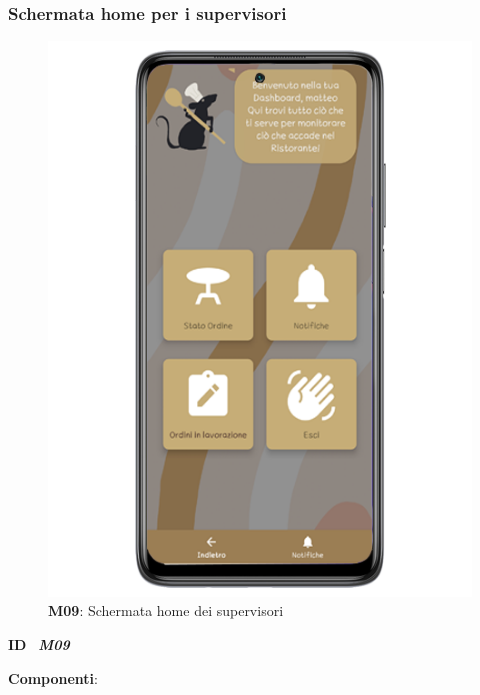         \newpage

        \subsubsection{Schermata home per i supervisori}
          \begin{figure}[H]
              \centering
              \includegraphics[scale=2.5]{assets/Mockup/Mockup_HypervisorDash.png}
              \caption*{\textbf{M09}: Schermata home dei supervisori}\label{fig:Mockup_HypervisorDash}
          \end{figure}

          \begin{flushleft}
              \textbf{ID}   \ \Large{\textit{\textbf{M09}}}
          \end{flushleft}

          \textbf{Componenti}:

